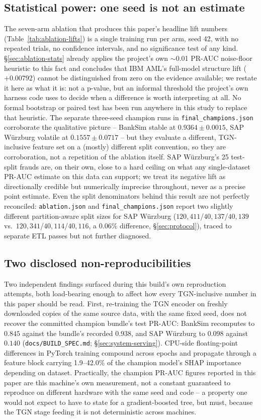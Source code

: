 \subsection{Statistical power: one seed is not an estimate}\label{sec:limitations-stats}
The seven-arm ablation that produces this paper's headline lift numbers
(Table~\ref{tab:ablation-lifts}) is a single training run per arm, seed 42,
with no repeated trials, no confidence intervals, and no significance test of
any kind. \S\ref{sec:ablation-stats} already applies the project's own
$\sim$0.01 PR-AUC noise-floor heuristic to this fact and concludes that IBM
AML's full-model structure lift ($+0.00792$) cannot be distinguished from zero
on the evidence available; we restate it here as what it is: not a p-value,
but an informal threshold the project's own harness code uses to decide when
a difference is worth interpreting at all. No formal bootstrap or paired test
has been run anywhere in this study to replace that heuristic. The separate
three-seed champion runs in \texttt{final\_champions.json} corroborate the
qualitative picture -- BankSim stable at $0.9364\pm0.0015$, SAP W\"urzburg
volatile at $0.1557\pm0.0717$ -- but they evaluate a different, TGN-inclusive
feature set on a (mostly) different split convention, so they are
corroboration, not a repetition of the ablation itself. SAP W\"urzburg's 25
test-split frauds are, on their own, close to a hard ceiling on what any
single-dataset PR-AUC estimate on this data can support; we treat its
negative lift as directionally credible but numerically imprecise throughout,
never as a precise point estimate. Even the split denominators behind this
result are not perfectly reconciled: \texttt{ablation.json} and
\texttt{final\_champions.json} report two slightly different partition-aware
split sizes for SAP W\"urzburg ($120{,}411$/$40{,}137$/$40{,}139$ vs.\
$120{,}341$/$40{,}114$/$40{,}116$, a $0.06\%$ difference, \S\ref{sec:protocol}),
traced to separate ETL passes but not further diagnosed.

\subsection{Two disclosed non-reproducibilities}
Two independent findings surfaced during this build's own reproduction
attempts, both load-bearing enough to affect how every TGN-inclusive number
in this paper should be read. First, re-training the TGN encoder on freshly
downloaded copies of the same source data, with the same fixed seed, does
not recover the committed champion bundle's test PR-AUC: BankSim recomputes
to $0.845$ against the bundle's recorded $0.938$, and SAP W\"urzburg to
$0.098$ against $0.140$ (\texttt{docs/BUILD\_SPEC.md}; \S\ref{sec:system-serving}).
CPU-side floating-point differences in PyTorch training compound across
epochs and propagate through a feature block carrying 1.9--42.0\% of the
champion model's SHAP importance depending on dataset. Practically, the
champion PR-AUC figures reported in this paper are this machine's own
measurement, not a constant guaranteed to reproduce on different hardware
with the same seed and code -- a property one would not expect to have to
state for a gradient-boosted tree, but must, because the TGN stage feeding
it is not deterministic across machines.

